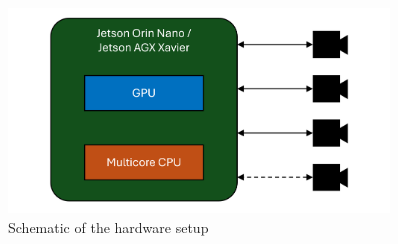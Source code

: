 \begin{figure}
	\centerline{\includegraphics[width=0.9\textwidth]{images/HW-schematics.png}}
	\caption{\centering Schematic of the hardware setup}
	\label{fig:hw-setup}
\end{figure}
